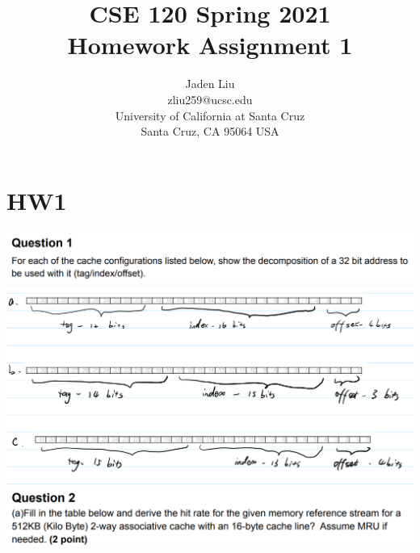 \documentclass[12pt]{article}
\begin{document}
\title{ CSE 120 Spring 2021\\
	Homework Assignment 1}

\author{Jaden Liu \\
	zliu259@ucsc.edu\\ 
University of California at Santa Cruz\\
Santa Cruz, CA 95064 USA }

\maketitle


\section{HW1} 
\includegraphics[scale=0.37]{q1_q.png}\\
\includegraphics[scale=0.3]{q1.png}\\
\includegraphics[scale=0.37]{q2_q1.png}\\
\end{document}
